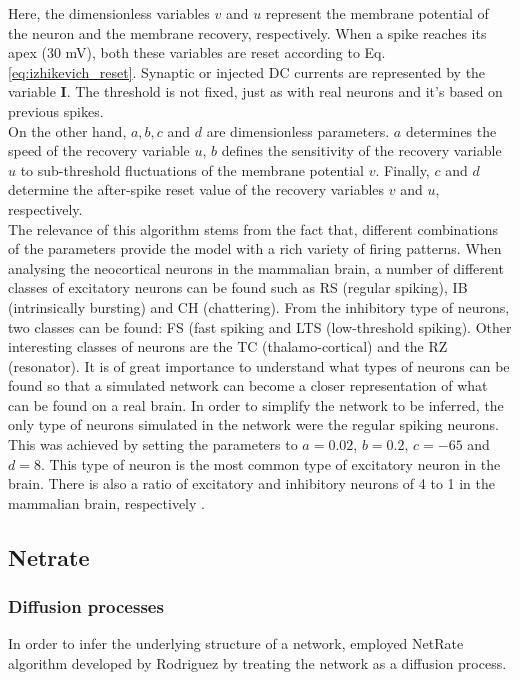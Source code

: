 \documentclass[10pt]{article}
\begin{document}
Here, the dimensionless variables $v$ and $u$ represent the membrane potential of the neuron and the membrane recovery, respectively. When a spike reaches its apex (30 mV), both these variables are reset according to Eq. \ref{eq:izhikevich_reset}. Synaptic or injected DC currents are represented by the variable \textbf{I}. The threshold is not fixed, just as with real neurons and it's based on previous spikes. 
\\
On the other hand, $a, b, c$ and $d$ are dimensionless parameters. $a$ determines the speed of the recovery variable $u$, $b$ defines the sensitivity of the recovery variable $u$ to sub-threshold fluctuations of the membrane potential $v$. Finally, $c$ and $d$ determine the after-spike reset value of the recovery variables $v$ and $u$, respectively. 
\\
The relevance of this algorithm stems from the fact that, different combinations of the parameters provide the model with a rich variety of firing patterns. When analysing the neocortical neurons in the mammalian brain, a number of different classes of excitatory neurons can be found \cite{connors1990intrinsic, gray1996chattering} such as RS (regular spiking), IB (intrinsically bursting) and CH (chattering). From the inhibitory type of neurons, two classes can be found: FS (fast spiking and LTS (low-threshold spiking). Other interesting classes of neurons are the TC (thalamo-cortical) and the RZ (resonator). It is of great importance to understand what types of neurons can be found so that a simulated network can become a closer representation of what can be found on a real brain. In order to simplify the network to be inferred, the only type of neurons simulated in the network were the regular spiking neurons. This was achieved by setting the parameters to $a=0.02$, $b=0.2$, $c=-65$ and $d=8$. This type of neuron is the most common type of excitatory neuron in the brain. There is also a ratio of excitatory and inhibitory neurons of 4 to 1 in the mammalian brain, respectively \cite{izhikevich2003simple}.


\subsection{Netrate}

\subsubsection{Diffusion processes}

In order to infer the underlying structure of a network, \cite{alexandru2018estimating} employed  NetRate algorithm developed by Rodriguez \cite{rodriguez2011uncovering} by treating the network as a diffusion process.
\end{document}
